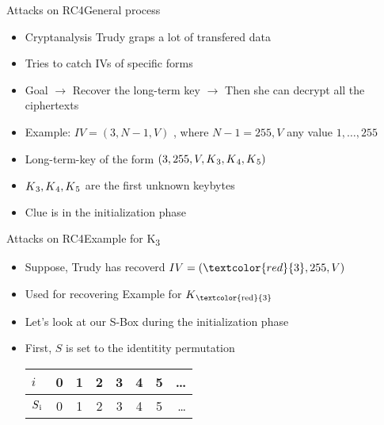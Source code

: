 \documentclass[
	aspectratio=169,	%
	onlytextwidth,		%
	t,					%
	]{beamer}
\begin{document}
\begin{frame}[fragile]{Attacks on RC4}{General process}
	\begin{itemize}
		\item Cryptanalysis Trudy graps a lot of transfered data
		\item Tries to catch IVs of specific forms 
		\item Goal $\rightarrow$ Recover the long-term key $\rightarrow$ Then she can decrypt all the ciphertexts
		\item Example: $ IV = (3, N-1, V)$ , where $N-1 = 255, V$ any value ${1,\dots,255}$
		\item Long-term-key of the form $(3, 255, V, K\textsubscript{3}, K\textsubscript{4},K\textsubscript{5})$
		\item $K\textsubscript{3}, K\textsubscript{4},K\textsubscript{5}$ are the first unknown keybytes
		\item Clue is in the initialization phase
	\end{itemize}
\end{frame}

\begin{frame}[fragile]{Attacks on RC4}{Example for K\textsubscript{3}}
	\begin{itemize}
		\item Suppose, Trudy has recoverd $IV = (\textcolor{red}{3}, 255, V)$ 
		\item Used for recovering Example for $K\textsubscript{\textcolor{red}{3}}$
		\item Let's look at our S-Box during the initialization phase
		\item First, $S$ is set to the identitity permutation
		\medskip
		\begin{table}[h!]
			\begin{center}
			  \label{tab:table1}
			  \begin{tabular}{l|c|c|c|c|c|c|r}
				$i$ & 0 & 1 & 2 & 3 & 4 & 5 & \dots\\
				\hline
				$S\textsubscript{i}$ & 0 & 1 & 2 & 3 & 4 & 5 & \dots\\
			  \end{tabular}
			\end{center}
		  \end{table}

	\end{itemize}
\end{frame}
\end{document}
